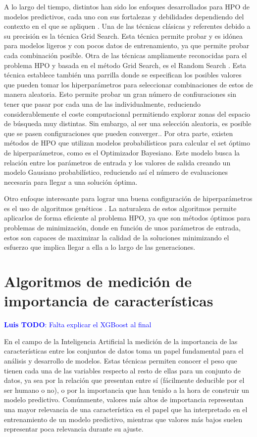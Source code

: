 \documentclass{uathesis-es}
\begin{document}
{	A lo largo del tiempo, distintos han sido los enfoques desarrollados para HPO de modelos predictivos, cada uno con sus fortalezas y debilidades dependiendo del contexto en el que se apliquen \cite{bischl2023hyperparameter}. Una de las técnicas clásicas y referentes debido a su precisión es la técnica Grid Search. Esta técnica permite probar y es idónea para modelos ligeros y con pocos datos de entrenamiento, ya que permite probar cada combinación posible. Otra de las técnicas ampliamente reconocidas para el problema HPO y basada en el método Grid Search, es el Random Search \cite{bergstra2012random}. Esta técnica establece también una parrilla donde se especifican los posibles valores que pueden tomar los hiperparámetros para seleccionar combinaciones de estos de manera aleatoria. Esto permite probar un gran número de confiuraciones sin tener que pasar por cada una de las individualmente, reduciendo considerablemente el coste computacional permitiendo explorar zonas del espacio de búsqueda muy distintas. Sin embargo, al ser una selección aleatoria, es posible que se pasen configuraciones que pueden converger.. Por otra parte, existen métodos de HPO que utilizan modelos probabilísticos para calcular el set óptimo de hiperparámetros, como es el Optimizador Bayesiano. Este modelo busca la relación entre los parámetros de entrada y los valores de salida creando un modelo Gausiano probabilístico, reduciendo así el número de evaluaciones necesaria para llegar a una solución óptima.
	
	Otro enfoque interesante para lograr una buena configuración de hiperparámetros es el uso de algoritmos genéticos \cite{alibrahim2021hyperparameter}. La naturaleza de estos algoritmos permite aplicarlos de forma eficiente al problema HPO, ya que son métodos óptimos para problemas de minimización, donde en función de unos parámetros de entrada, estos son capaces de maximizar la calidad de la soluciones minimizando el esfuerzo que implica llegar a ella a lo largo de las generaciones.
	
	
	\section{Algoritmos de medición de importancia de características}
	\label{SOAT_FEATURE_IMPORTANCE_METHODS}
	
	\textcolor{blue}{\textbf{Luis TODO}: Falta explicar el XGBoost al final}
	
	En el campo de la Inteligencia Artificial la medición de la importancia de las características entre los conjuntos de datos toma un papel fundamental para el análisis y desarrollo de modelos. Estas técnicas permiten conocer el peso que tienen cada una de las variables respecto al resto de ellas para un conjunto de datos, ya sea por la relación que presentan entre sí (fácilmente deducible por el ser humano o no), o por la importancia que han tenido a la hora de construir un modelo predictivo. Comúnmente, valores más altos de importancia representan una mayor relevancia de una característica  en el papel que ha interpretado en el entrenamiento de un modelo predictivo, mientras que valores más bajos suelen representar poca relevancia durante su ajuste.
	
}
\end{document}
